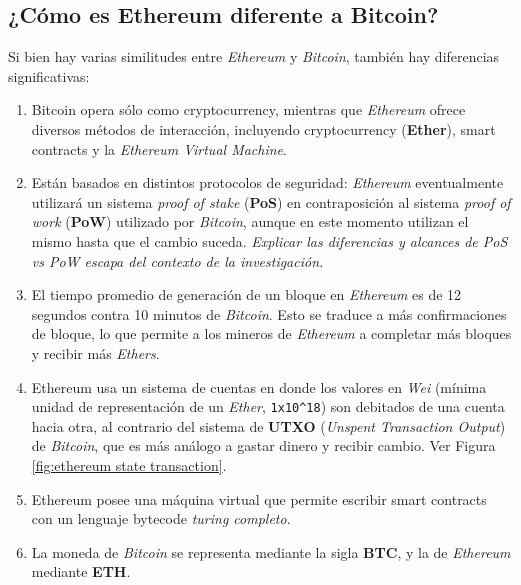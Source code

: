 \subsection{¿Cómo es Ethereum diferente a Bitcoin?}
Si bien hay varias similitudes entre \textit{Ethereum} y \textit{Bitcoin}, también hay diferencias significativas:
\begin{enumerate}
    \item Bitcoin opera sólo como cryptocurrency, mientras que \textit{Ethereum} ofrece diversos métodos de interacción, incluyendo cryptocurrency (\textbf{Ether}), smart contracts y la \textit{Ethereum Virtual Machine}.
    \item Están basados en distintos protocolos de seguridad: \textit{Ethereum} eventualmente utilizará un sistema \textit{proof of stake} (\textbf{PoS}) en contraposición al sistema \textit{proof of work} (\textbf{PoW}) utilizado por \textit{Bitcoin}, aunque en este momento utilizan el mismo hasta que el cambio suceda. \textit{Explicar las diferencias y alcances de PoS vs PoW escapa del contexto de la investigación.}
    \item El tiempo promedio de generación de un bloque en \textit{Ethereum} es de 12 segundos contra 10 minutos de \textit{Bitcoin}. Esto se traduce a más confirmaciones de bloque, lo que permite a los mineros de \textit{Ethereum} a completar más bloques y recibir más \textit{Ethers}.
    \item Ethereum usa un sistema de cuentas en donde los valores en \textit{Wei} (mínima unidad de representación de un \textit{Ether}, \verb|1x10^18|) son debitados de una cuenta hacia otra, al contrario del sistema de \textbf{UTXO} (\textit{Unspent Transaction Output}) de \textit{Bitcoin}, que es más análogo a gastar dinero y recibir cambio. Ver Figura \ref{fig:ethereum state transaction}.
    \item Ethereum posee una máquina virtual que permite escribir smart contracts con un lenguaje bytecode \textit{turing completo}.
    \item La moneda de \textit{Bitcoin} se representa mediante la sigla \textbf{BTC}, y la de \textit{Ethereum} mediante \textbf{ETH}.
\end{enumerate}

